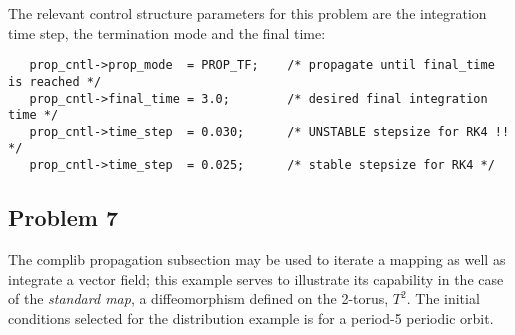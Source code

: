 \medskip
\begin{center}
\end{center}
\medskip

\noindent The relevant control structure parameters for this problem are the integration time step, the
termination mode and the final time:

\begin{verbatim}
   prop_cntl->prop_mode  = PROP_TF;    /* propagate until final_time is reached */
   prop_cntl->final_time = 3.0;        /* desired final integration time */
   prop_cntl->time_step  = 0.030;      /* UNSTABLE stepsize for RK4 !! */
   prop_cntl->time_step  = 0.025;      /* stable stepsize for RK4 */
\end{verbatim}



\subsection{Problem 7}

\noindent  The complib propagation subsection may be used to iterate a mapping as well as integrate
a vector field;  this example serves to illustrate its capability in the case of the {\em standard
map}, a diffeomorphism defined on the 2-torus, $T^2$.  The initial conditions selected for the
distribution example is for a period-5 periodic orbit.

